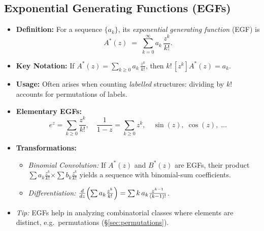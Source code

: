 \documentclass[11pt,letterpaper]{article}
\begin{document}
\subsection{Exponential Generating Functions (EGFs)}
\begin{itemize}
  \item \textbf{Definition:} For a sequence \(\{a_k\}\), its \emph{exponential generating function} (EGF) is
    \[
      A^*(z) \;=\;\sum_{k=0}^{\infty} a_k \,\frac{z^k}{k!}.
    \]
  \item \textbf{Key Notation:} If \(A^*(z) = \sum_{k\ge0} a_k\,\frac{z^k}{k!}\), then \(k!\,[z^k]A^*(z)=a_k\).
  \item \textbf{Usage:} Often arises when counting \emph{labelled} structures: dividing by \(k!\) accounts for permutations of labels.
  \item \textbf{Elementary EGFs:} 
    \[
      e^z = \sum_{k\ge0} \frac{z^k}{k!},\quad
      \frac{1}{1-z} = \sum_{k\ge0} z^k,\quad
      \sin(z),\;\cos(z),\;\ldots
    \]
  \item \textbf{Transformations:}
    \begin{itemize}
      \item \textit{Binomial Convolution:} If \(A^*(z)\) and \(B^*(z)\) are EGFs, their product \(\sum a_k \frac{z^k}{k!}\)\(\times\)\(\sum b_k \frac{z^k}{k!}\) yields a sequence with binomial-sum coefficients.
      \item \textit{Differentiation:} \(\frac{d}{dz}\Bigl(\sum a_k \frac{z^k}{k!}\Bigr) = \sum k\,a_k \frac{z^{k-1}}{(k-1)!}\).
    \end{itemize}
  \item \emph{Tip:} EGFs help in analyzing combinatorial classes where elements are distinct, e.g.\ permutations (\S\ref{sec:permutations}).
\end{itemize}

\end{document}
